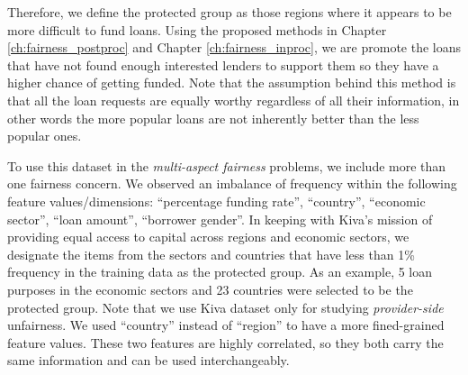             Therefore, we define the protected group as those regions where it appears to be more difficult to fund loans. Using the proposed methods in Chapter \ref{ch:fairness_postproc} and Chapter \ref{ch:fairness_inproc}, we are promote the loans that have not found enough interested lenders to support them so they have a higher chance of getting funded. Note that the assumption behind this method is that all the loan requests are equally worthy regardless of all their information, in other words the more popular loans are not inherently better than the less popular ones.
        
            To use this dataset in the \textit{multi-aspect fairness} problems, we include more than one fairness concern. We observed an imbalance of frequency within the following feature values/dimensions: ``percentage funding rate'', ``country'', ``economic sector'', ``loan amount'', ``borrower gender''. In keeping with Kiva's mission of providing equal access to capital across regions and economic sectors, we designate the items from the sectors and countries that have less than 1\% frequency in the training data as the protected group. As an example, 5 loan purposes in the economic sectors and 23 countries were selected to be the protected group. Note that we use Kiva dataset only for studying \textit{provider-side} unfairness. We used ``country'' instead of ``region'' to have a more fined-grained feature values. These two features are highly correlated, so they both carry the same information and can be used interchangeably.
        



